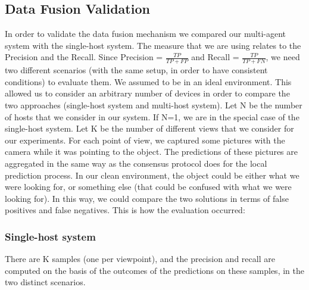 \documentclass[10pt,conference,compsocconf]{IEEEtran}
\begin{document}
\begin{enumerate}
\subsection{Data Fusion Validation}
In order to validate the data fusion mechanism we compared our multi-agent system with the single-host system. The measure that we are using relates to the Precision and the Recall. Since Precision = $\frac{TP}{TP+FP}$ and Recall = $\frac{TP}{TP+FN}$, we need two different scenarios (with the same setup, in order to have consistent conditions) to evaluate them.
We assumed to be in an ideal environment. This allowed us to consider an arbitrary number of devices in order to compare the two approaches (single-host system and multi-host system). Let N be the number of hosts that we consider in our system. If N=1, we are in the special case of the single-host system. Let K be the number of different views that we consider for our experiments. For each point of view, we captured some pictures with the camera while it was pointing to the object. The predictions of these pictures are aggregated in the same way as the consensus protocol does for the local prediction process.
In our clean environment, the object could be either what we were looking for, or something else (that could be confused with what we were looking for). In this way, we could compare the two solutions in terms of false positives and false negatives.
This is how the evaluation occurred:
\subsubsection*{Single-host system}There are K samples (one per viewpoint), and the precision and recall are computed on the basis of the outcomes of the predictions on these samples, in the two distinct scenarios.

\end{enumerate}
\end{document}

